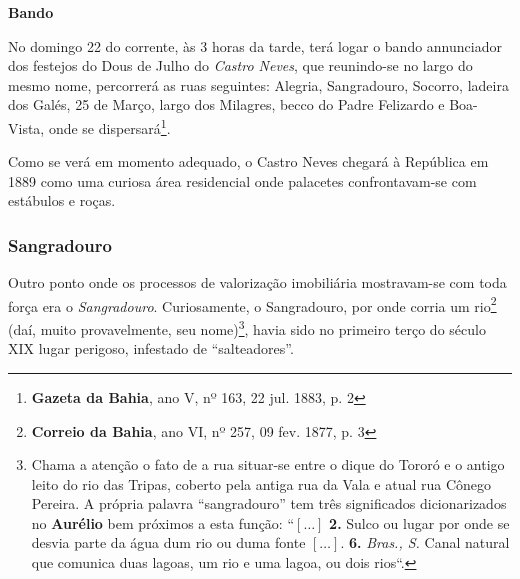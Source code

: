 \begin{citacao}
\textbf{Bando}

No domingo 22 do corrente, às 3 horas da tarde, terá logar o bando annunciador dos festejos do Dous de Julho do \textit{Castro Neves}, que reunindo-se no largo do mesmo nome, percorrerá as ruas seguintes: Alegria, Sangradouro, Socorro, ladeira dos Galés, 25 de Março, largo dos Milagres, becco do Padre Felizardo e Boa-Vista, onde se dispersará\footnote{\textbf{Gazeta da Bahia}, ano V, nº 163, 22 jul. 1883, p. 2}.
\end{citacao}

Como se verá em momento adequado, o Castro Neves chegará à República em 1889 como uma curiosa área residencial onde palacetes confrontavam-se com estábulos e roças.

\subsubsection{Sangradouro}\label{subsubsec:sangradouro}

Outro ponto onde os processos de valorização imobiliária mostravam-se com toda força era o \textit{Sangradouro}. Curiosamente, o Sangradouro, por onde corria um rio\footnote{\textbf{Correio da Bahia}, ano VI, nº 257, 09 fev. 1877, p. 3} (daí, muito provavelmente, seu nome)\footnote{Chama a atenção o fato de a rua situar-se entre o dique do Tororó e o antigo leito do rio das Tripas, coberto pela antiga rua da Vala e atual rua Cônego Pereira. A própria palavra ``sangradouro'' tem três significados dicionarizados no \textbf{Aurélio} bem próximos a esta função: ``\([\dots]\) \textbf{2.} Sulco ou lugar por onde se desvia parte da água dum rio ou duma fonte \([\dots]\). \textbf{6.} \textit{Bras., S.} Canal natural que comunica duas lagoas, um rio e uma lagoa, ou dois rios``.}, havia sido no primeiro terço do século XIX lugar perigoso, infestado de ``salteadores''.

